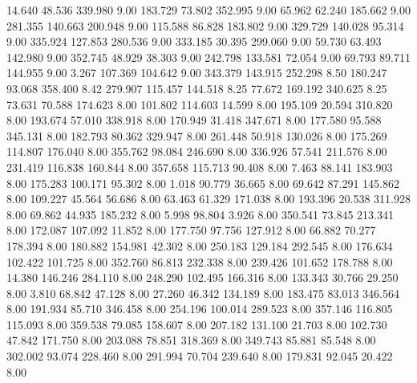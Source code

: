   14.640   48.536  339.980         9.00
 183.729   73.802  352.995         9.00
  65.962   62.240  185.662         9.00
 281.355  140.663  200.948         9.00
 115.588   86.828  183.802         9.00
 329.729  140.028   95.314         9.00
 335.924  127.853  280.536         9.00
 333.185   30.395  299.060         9.00
  59.730   63.493  142.980         9.00
 352.745   48.929   38.303         9.00
 242.798  133.581   72.054         9.00
  69.793   89.711  144.955         9.00
   3.267  107.369  104.642         9.00
 343.379  143.915  252.298         8.50
 180.247   93.068  358.400         8.42
 279.907  115.457  144.518         8.25
  77.672  169.192  340.625         8.25
  73.631   70.588  174.623         8.00
 101.802  114.603   14.599         8.00
 195.109   20.594  310.820         8.00
 193.674   57.010  338.918         8.00
 170.949   31.418  347.671         8.00
 177.580   95.588  345.131         8.00
 182.793   80.362  329.947         8.00
 261.448   50.918  130.026         8.00
 175.269  114.807  176.040         8.00
 355.762   98.084  246.690         8.00
 336.926   57.541  211.576         8.00
 231.419  116.838  160.844         8.00
 357.658  115.713   90.408         8.00
   7.463   88.141  183.903         8.00
 175.283  100.171   95.302         8.00
   1.018   90.779   36.665         8.00
  69.642   87.291  145.862         8.00
 109.227   45.564   56.686         8.00
  63.463   61.329  171.038         8.00
 193.396   20.538  311.928         8.00
  69.862   44.935  185.232         8.00
   5.998   98.804    3.926         8.00
 350.541   73.845  213.341         8.00
 172.087  107.092   11.852         8.00
 177.750   97.756  127.912         8.00
  66.882   70.277  178.394         8.00
 180.882  154.981   42.302         8.00
 250.183  129.184  292.545         8.00
 176.634  102.422  101.725         8.00
 352.760   86.813  232.338         8.00
 239.426  101.652  178.788         8.00
  14.380  146.246  284.110         8.00
 248.290  102.495  166.316         8.00
 133.343   30.766   29.250         8.00
   3.810   68.842   47.128         8.00
  27.260   46.342  134.189         8.00
 183.475   83.013  346.564         8.00
 191.934   85.710  346.458         8.00
 254.196  100.014  289.523         8.00
 357.146  116.805  115.093         8.00
 359.538   79.085  158.607         8.00
 207.182  131.100   21.703         8.00
 102.730   47.842  171.750         8.00
 203.088   78.851  318.369         8.00
 349.743   85.881   85.548         8.00
 302.002   93.074  228.460         8.00
 291.994   70.704  239.640         8.00
 179.831   92.045   20.422         8.00

